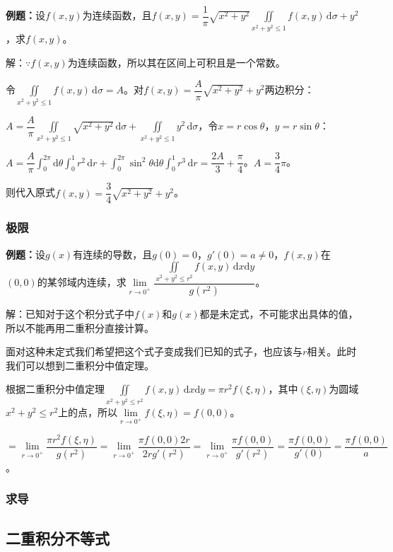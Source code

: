 \documentclass[UTF8, 12pt]{ctexart}
\begin{document}
\textbf{例题：}设$f(x,y)$为连续函数，且$f(x,y)=\dfrac{1}{\pi}\sqrt{x^2+y^2}\iint\limits_{x^2+y^2\leqslant1}f(x,y)\,\textrm{d}\sigma+y^2$，求$f(x,y)$。

解：$\because f(x,y)$为连续函数，所以其在区间上可积且是一个常数。

令$\iint\limits_{x^2+y^2\leqslant1}f(x,y)\,\textrm{d}\sigma=A$。对$f(x,y)=\dfrac{A}{\pi}\sqrt{x^2+y^2}+y^2$两边积分：

$A=\dfrac{A}{\pi}\iint\limits_{x^2+y^2\leqslant1}\sqrt{x^2+y^2}\,\textrm{d}\sigma+\iint\limits_{x^2+y^2\leqslant1}y^2\,\textrm{d}\sigma$，令$x=r\cos\theta$，$y=r\sin\theta$：

$A=\dfrac{A}{\pi}\int_0^{2\pi}\textrm{d}\theta\int_0^1r^2\,\textrm{d}r+\int_0^{2\pi}\sin^2\theta\textrm{d}\theta\int_0^1r^3\,\textrm{d}r=\dfrac{2A}{3}+\dfrac{\pi}{4}$。$A=\dfrac{3}{4}\pi$。

则代入原式$f(x,y)=\dfrac{3}{4}\sqrt{x^2+y^2}+y^2$。

\subsubsection{极限}

\textbf{例题：}设$g(x)$有连续的导数，且$g(0)=0$，$g'(0)=a\neq0$，$f(x,y)$在$(0,0)$的某邻域内连续，求$\lim\limits_{r\to0^+}\dfrac{\iint\limits_{x^2+y^2\leqslant r^2}f(x,y)\,\textrm{d}x\textrm{d}y}{g(r^2)}$。

解：已知对于这个积分式子中$f(x)$和$g(x)$都是未定式，不可能求出具体的值，所以不能再用二重积分直接计算。

面对这种未定式我们希望把这个式子变成我们已知的式子，也应该与$r$相关。此时我们可以想到二重积分中值定理。

根据二重积分中值定理$\iint\limits_{x^2+y^2\leqslant r^2}f(x,y)\,\textrm{d}x\textrm{d}y=\pi r^2f(\xi,\eta)$，其中$(\xi,\eta)$为圆域$x^2+y^2\leqslant r^2$上的点，所以$\lim\limits_{r\to0^+}f(\xi,\eta)=f(0,0)$。

$=\lim\limits_{r\to0^+}\dfrac{\pi r^2f(\xi,\eta)}{g(r^2)}=\lim\limits_{r\to0^+}\dfrac{\pi f(0,0)2r}{2rg'(r^2)}=\lim\limits_{r\to0^+}\dfrac{\pi f(0,0)}{g'(r^2)}=\dfrac{\pi f(0,0)}{g'(0)}=\dfrac{\pi f(0,0)}{a}$。

\subsubsection{求导}

\subsection{二重积分不等式}
\end{document}
